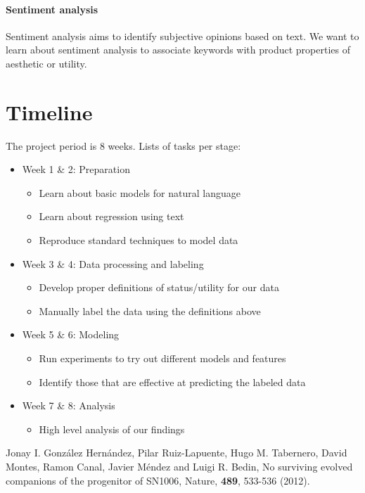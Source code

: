 \documentclass[dvips,12pt]{article}
\begin{document}
\paragraph{Sentiment analysis}
Sentiment analysis aims to identify subjective opinions based on text. We want to learn about sentiment analysis to associate keywords with product properties of aesthetic or utility.

\section{Timeline}
The project period is 8 weeks. Lists of tasks per stage:

\begin{itemize}
	
	\item Week 1 \& 2: Preparation
	\begin{itemize}
		\item Learn about basic models for natural language
		\item Learn about regression using text			
		\item Reproduce standard techniques to model data
	\end{itemize}
	
	\item Week 3 \& 4: Data processing and labeling
	\begin{itemize}
		\item Develop proper definitions of status/utility for our data
		\item Manually label the data using the definitions above
	\end{itemize}
	
	\item Week 5 \& 6: Modeling
	\begin{itemize}
		\item Run experiments to try out different models and features
		\item Identify those that are effective at predicting the labeled data
	\end{itemize}
	
	\item Week 7 \& 8: Analysis
	\begin{itemize}
		\item High level analysis of our findings
	\end{itemize}
\end{itemize}




\begin{thebibliography}{99}

 Jonay I. Gonz\'{a}lez Hern\'{a}ndez, 
Pilar Ruiz-Lapuente,	
Hugo M. Tabernero,	
David Montes,	
Ramon Canal,	
Javier M\'{e}ndez	
and Luigi R. Bedin,
{No surviving evolved companions of the progenitor of SN1006},
Nature, {\bf 489}, 533-536 (2012).

\end{thebibliography}
\end{document}
